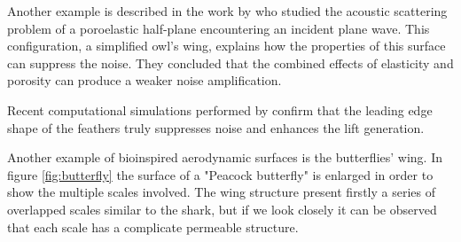 Another example is described in the work by \citet{jaworski2013aerodynamic} who studied the acoustic scattering problem of a poroelastic half-plane encountering an incident plane wave.
This configuration, a simplified owl's wing, explains how the properties of this surface can suppress the noise.
They concluded that the combined effects of elasticity and porosity can produce a weaker noise amplification.

Recent computational simulations performed by \citet{rao2017owl} confirm that the leading edge shape of the feathers truly suppresses noise and enhances the lift generation.

Another example of bioinspired aerodynamic surfaces is the butterflies' wing.
In figure \ref{fig:butterfly} the surface of a "Peacock butterfly" is enlarged in order to show the multiple scales involved. The wing structure present firstly a series of overlapped scales similar to the shark, but if we look closely it can be observed that each scale has a complicate permeable structure.

